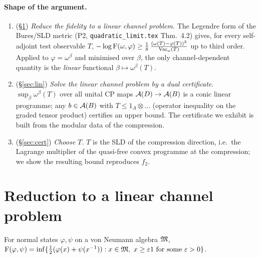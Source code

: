 \documentclass[11pt,a4paper]{article}
\begin{document}
\paragraph{Shape of the argument.}
\begin{enumerate}[leftmargin=1.6em,itemsep=1pt]
\item (\S\ref{sec:red}) \emph{Reduce the fidelity to a linear channel problem.}  The Legendre
form of the Bures/SLD metric (P2, \texttt{quadratic\_limit.tex} Thm.~4.2) gives, for every
self-adjoint test observable \(T\), \(-\log\operatorname{F}(\omega,\varphi)\ge\tfrac18\,\frac{(\omega(T)-\varphi(T))^2}{\operatorname{Var}_\omega(T)}\)
up to third order.  Applied to \(\varphi=\omega^\beta\) and minimised over \(\beta\), the
only channel-dependent quantity is the \emph{linear} functional \(\beta\mapsto\omega^\beta(T)\).
\item (\S\ref{sec:lin}) \emph{Solve the linear channel problem by a dual certificate.}
\(\sup_\beta\omega^\beta(T)\) over all unital CP maps \(\mathcal A(D)\to\mathcal A(B)\) is a conic linear
programme; any \(b\in\mathcal A(B)\) with \(T\le 1_A\otimes\!\!\ldots\) (operator inequality on the
graded tensor product) certifies an upper bound.  The certificate we exhibit is built from
the modular data of the compression.
\item (\S\ref{sec:cert}) \emph{Choose \(T\).}  \(T\) is the SLD of the compression direction,
i.e.\ the Lagrange multiplier of the quasi-free convex programme at the compression; we show
the resulting bound reproduces \(f_2\).
\end{enumerate}

\section{Reduction to a linear channel problem}\label{sec:red}

\begin{lemma}\label{lem:alberti}
For normal states \(\varphi,\psi\) on a von Neumann algebra \(\mathfrak M\),
\(\Fid(\varphi,\psi)=\inf\{\tfrac12(\varphi(x)+\psi(x^{-1})):x\in\cM,\ x\ge\eps1\text{ for some }\eps>0\}\).
\end{lemma}
\end{document}
